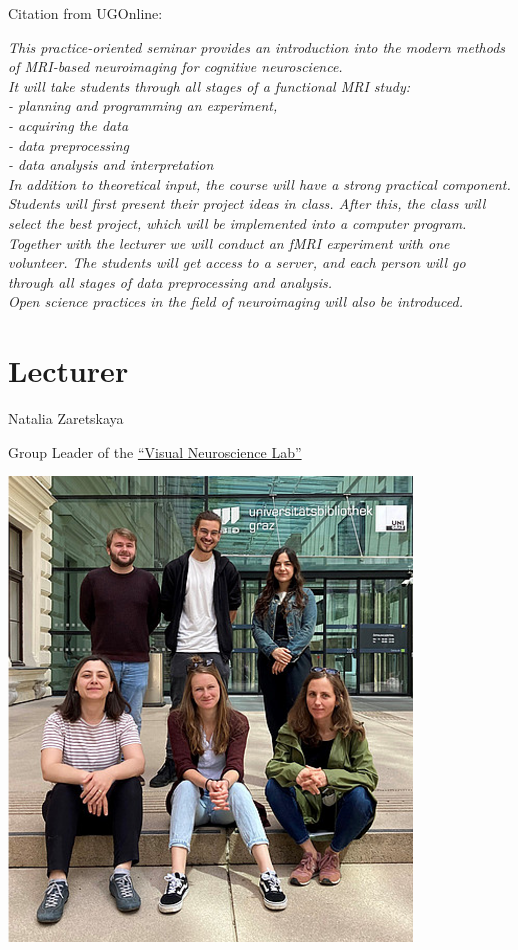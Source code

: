 \documentclass[
  letterpaper,
]{report}
\begin{document}
Citation from UGOnline:

\emph{This practice-oriented seminar provides an introduction into the
modern methods of MRI-based neuroimaging for cognitive neuroscience.\\
It will take students through all stages of a functional MRI study:\\
- planning and programming an experiment,\\
- acquiring the data\\
- data preprocessing\\
- data analysis and interpretation\\
In addition to theoretical input, the course will have a strong
practical component. Students will first present their project ideas in
class. After this, the class will select the best project, which will be
implemented into a computer program. Together with the lecturer we will
conduct an fMRI experiment with one volunteer. The students will get
access to a server, and each person will go through all stages of data
preprocessing and analysis.\\
Open science practices in the field of neuroimaging will also be
introduced.}

\section*{Lecturer}\label{lecturer}


Natalia Zaretskaya

Group Leader of the \href{https://neurovision.uni-graz.at/en/}{``Visual
Neuroscience Lab''}

\includegraphics[width=4.21875in,height=\textheight,keepaspectratio]{images/clipboard-890498128.png}
\end{document}
